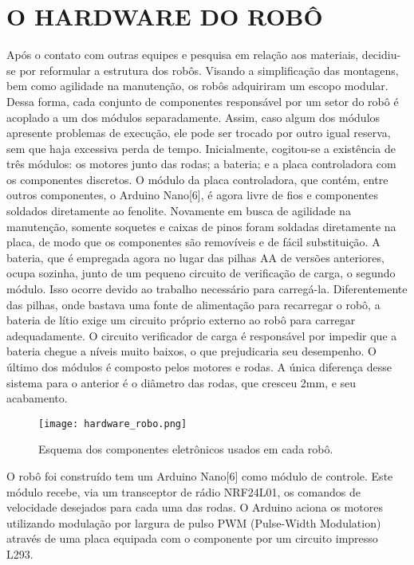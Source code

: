 
\section{O HARDWARE DO ROBÔ}

Após o contato com outras equipes e pesquisa em relação aos materiais, decidiu-se por reformular a estrutura dos robôs. Visando a simplificação das montagens, bem como agilidade na manutenção, os robôs adquiriram um escopo modular. Dessa forma, cada conjunto de componentes responsável por um setor do robô é acoplado a um dos módulos separadamente. Assim, caso algum dos módulos apresente problemas de execução, ele pode ser trocado por outro igual reserva, sem que haja excessiva perda de tempo. Inicialmente, cogitou-se a existência de três módulos: os motores junto das rodas; a bateria; e a placa controladora com os componentes discretos. O módulo da placa controladora, que contém, entre outros componentes, o Arduino Nano[6], é agora livre de fios e componentes soldados diretamente ao fenolite. Novamente em busca de agilidade na manutenção, somente soquetes e caixas de pinos foram soldadas diretamente na placa, de modo que os componentes são removíveis e de fácil substituição. A bateria, que é empregada agora no lugar das pilhas AA de versões anteriores, ocupa sozinha, junto de um pequeno circuito de verificação de carga, o segundo módulo. Isso ocorre devido ao trabalho necessário para carregá-la. Diferentemente das pilhas, onde bastava uma fonte de alimentação para recarregar o robô, a bateria de lítio exige um circuito próprio externo ao robô para carregar adequadamente. O circuito verificador de carga é responsável por impedir que a bateria chegue a níveis muito baixos, o que prejudicaria seu desempenho. O último dos módulos é composto pelos motores e rodas. A única diferença desse sistema para o anterior é o diâmetro das rodas, que cresceu 2mm, e seu acabamento.

\begin{figure}[!htb]
\centering
\texttt{[image: hardware\_robo.png]}
\caption{Esquema dos componentes eletrônicos usados em cada robô.}
\label{fig:hardware_robo}
\end{figure}

O robô foi construído tem um Arduino Nano[6] como módulo de controle. Este módulo recebe, via um transceptor de rádio NRF24L01, os comandos de velocidade desejados para cada uma das rodas. O Arduino aciona os motores utilizando modulação por largura de pulso PWM (Pulse-Width Modulation) através de uma placa equipada com o componente por um circuito impresso L293.

